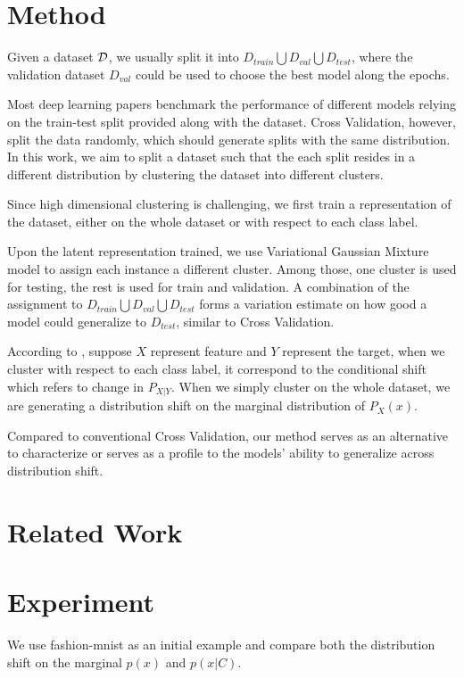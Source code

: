 \documentclass{article}
\begin{document}
\section{Method}
Given a dataset $\mathcal{D}$, we usually split it into $D_{train} \bigcup D_{val} \bigcup D_{test}$, where the validation dataset $D_{val}$ could be used to choose the best model along the epochs.

Most deep learning papers benchmark the performance of different models relying on the train-test split provided along with the dataset. Cross Validation, however, 
split the data randomly, which should generate splits with the same distribution. In this work, we aim to split a dataset such that the each split resides in a different distribution by clustering the  dataset into different clusters.

Since high dimensional clustering is challenging, we first train a representation of the dataset, either on the whole dataset or with respect to each class label. 




Upon the latent representation trained, we use Variational Gaussian Mixture model to assign each instance a different cluster. Among those, one cluster is used for testing, the rest is used for train and validation. A combination of the assignment to $D_{train} \bigcup D_{val} \bigcup D_{test}$ forms a variation estimate on how good a model could generalize to $D_{test}$, similar to Cross Validation.

According to \cite{zhang2013domain}, suppose $X$ represent feature and $Y$ represent the target, when we cluster with respect to each class label, it correspond to the conditional shift which refers to change in $P_{X|Y	}$. When we simply cluster on the whole dataset, we are generating a distribution shift on the marginal distribution of $P_X(x)$.


Compared to conventional Cross Validation, our method serves as an alternative to characterize or serves as a profile to the models' ability to generalize across distribution shift.
\section{Related Work}
\section{Experiment}
We use fashion-mnist \cite{FIXME} as an initial example and compare both the distribution shift on the marginal $p(x)$ and $p(x|C)$. 
\end{document}
